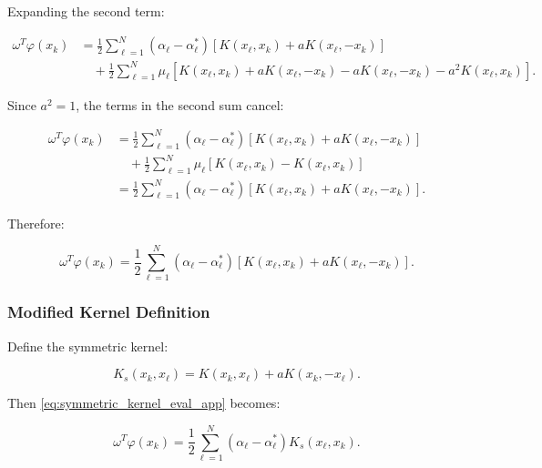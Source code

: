 \documentclass[mathematics,article,submit,pdftex,moreauthors]{Definitions/mdpi}
\begin{document}
Expanding the second term:
\begin{linenomath}
\begin{equation}
\begin{aligned}
\omega^T\varphi(x_k) 
&= \frac{1}{2}\sum_{\ell=1}^N (\alpha_\ell - \alpha_\ell^*)[K(x_\ell, x_k) + aK(x_\ell, -x_k)]\\
&\quad + \frac{1}{2}\sum_{\ell=1}^N \mu_\ell[K(x_\ell, x_k) + aK(x_\ell, -x_k) - aK(x_\ell, -x_k) - a^2K(x_\ell, x_k)].
\end{aligned}
\end{equation}
\end{linenomath}

Since $a^2 = 1$, the terms in the second sum cancel:
\begin{linenomath}
\begin{equation}
\begin{aligned}
\omega^T\varphi(x_k) 
&= \frac{1}{2}\sum_{\ell=1}^N (\alpha_\ell - \alpha_\ell^*)[K(x_\ell, x_k) + aK(x_\ell, -x_k)]\\
&\quad + \frac{1}{2}\sum_{\ell=1}^N \mu_\ell[K(x_\ell, x_k) - K(x_\ell, x_k)]\\
&= \frac{1}{2}\sum_{\ell=1}^N (\alpha_\ell - \alpha_\ell^*)[K(x_\ell, x_k) + aK(x_\ell, -x_k)].
\end{aligned}
\end{equation}
\end{linenomath}

Therefore:
\begin{linenomath}
\begin{equation}\label{eq:symmetric_kernel_eval_app}
\omega^T\varphi(x_k) = \frac{1}{2}\sum_{\ell=1}^N (\alpha_\ell - \alpha_\ell^*)[K(x_\ell, x_k) + aK(x_\ell, -x_k)].
\end{equation}
\end{linenomath}

\subsubsection{Modified Kernel Definition}

Define the symmetric kernel:
\begin{linenomath}
\begin{equation}
K_s(x_k, x_\ell) = K(x_k, x_\ell) + aK(x_k, -x_\ell).
\end{equation}
\end{linenomath}

Then \eqref{eq:symmetric_kernel_eval_app} becomes:
\begin{linenomath}
\begin{equation}
\omega^T\varphi(x_k) = \frac{1}{2}\sum_{\ell=1}^N (\alpha_\ell - \alpha_\ell^*) K_s(x_\ell, x_k).
\end{equation}
\end{linenomath}
\end{document}
